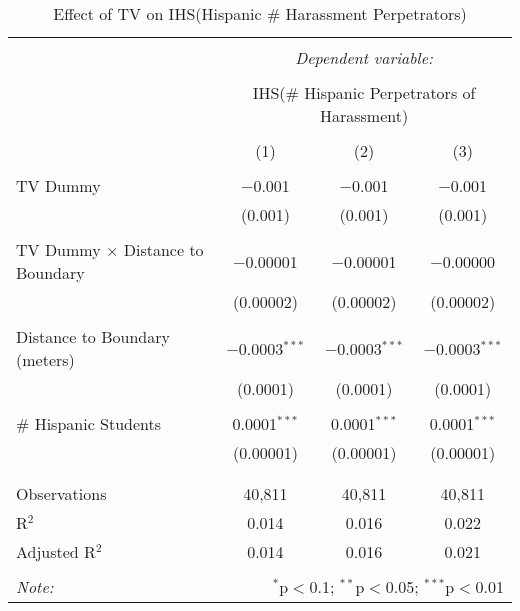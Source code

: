 
\begin{table}[!htbp] \centering 
  \caption{Effect of TV on IHS(Hispanic \# Harassment Perpetrators)} 
  \label{} 
\begin{tabular}{@{\extracolsep{-2pt}}lccc} 
\\[-1.8ex]\hline 
\hline \\[-1.8ex] 
 & \multicolumn{3}{c}{\textit{Dependent variable:}} \\ 
\cline{2-4} 
\\[-1.8ex] & \multicolumn{3}{c}{IHS(\# Hispanic Perpetrators of Harassment)} \\ 
\\[-1.8ex] & (1) & (2) & (3)\\ 
\hline \\[-1.8ex] 
 TV Dummy & $-$0.001 & $-$0.001 & $-$0.001 \\ 
  & (0.001) & (0.001) & (0.001) \\ 
  & & & \\ 
 TV Dummy $\times$ Distance to Boundary & $-$0.00001 & $-$0.00001 & $-$0.00000 \\ 
  & (0.00002) & (0.00002) & (0.00002) \\ 
  & & & \\ 
 Distance to Boundary (meters) & $-$0.0003$^{***}$ & $-$0.0003$^{***}$ & $-$0.0003$^{***}$ \\ 
  & (0.0001) & (0.0001) & (0.0001) \\ 
  & & & \\ 
 \# Hispanic Students & 0.0001$^{***}$ & 0.0001$^{***}$ & 0.0001$^{***}$ \\ 
  & (0.00001) & (0.00001) & (0.00001) \\ 
  & & & \\ 
\hline \\[-1.8ex] 
Observations & 40,811 & 40,811 & 40,811 \\ 
R$^{2}$ & 0.014 & 0.016 & 0.022 \\ 
Adjusted R$^{2}$ & 0.014 & 0.016 & 0.021 \\ 
\hline 
\hline \\[-1.8ex] 
\textit{Note:}  & \multicolumn{3}{r}{$^{*}$p$<$0.1; $^{**}$p$<$0.05; $^{***}$p$<$0.01} \\ 
\end{tabular} 
\end{table} 
